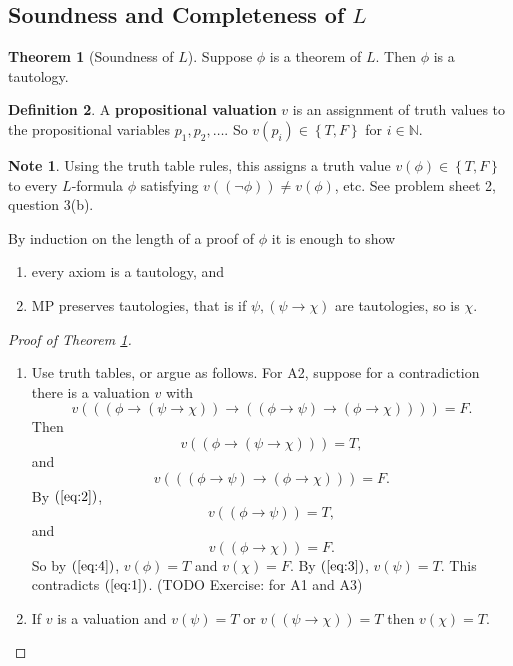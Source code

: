 \documentclass{article}
\newcommand{\N}{\mathbb{N}}
\newcommand{\rb}[1]{\left( #1 \right)}
\newcommand{\cb}[1]{\left\{ #1 \right\}}
\newcommand{\notb}[1]{\rb{\neg #1}}
\newcommand{\impb}[2]{\rb{#1 \rightarrow #2}}
\theoremstyle{definition}\newtheorem{definition}{Definition}[subsection]
\theoremstyle{definition}\newtheorem{remark}[definition]{Remark}
\theoremstyle{definition}\newtheorem*{example}{Example}
\theoremstyle{definition}\newtheorem*{note}{Note}
\newtheorem{theorem}[definition]{Theorem}
\begin{document}

\subsection{Soundness and Completeness of $ L $}

\begin{theorem}[Soundness of $ L $]
\label{thm:1.3.1}
Suppose $ \phi $ is a theorem of $ L $. Then $ \phi $ is a tautology.
\end{theorem}

\begin{definition}
A \textbf{propositional valuation} $ v $ is an assignment of truth values to the propositional variables $ p_1, p_2, \dots $. So $ v\rb{p_i} \in \cb{T, F} $ for $ i \in \N $.
\end{definition}

\begin{note}
Using the truth table rules, this assigns a truth value $ v\rb{\phi} \in \cb{T, F} $ to every $ L $-formula $ \phi $ satisfying $ v\rb{\notb{\phi}} \ne v\rb{\phi} $, etc. See problem sheet 2, question 3(b).
\end{note}

By induction on the length of a proof of $ \phi $ it is enough to show
\begin{enumerate}
\item every axiom is a tautology, and
\item MP preserves tautologies, that is if $ \psi, \impb{\psi}{\chi} $ are tautologies, so is $ \chi $.
\end{enumerate}

\begin{proof}[Proof of Theorem \ref{thm:1.3.1}]
\hfill
\begin{enumerate}
\item Use truth tables, or argue as follows. For A2, suppose for a contradiction there is a valuation $ v $ with
$$ v\rb{\impb{\impb{\phi}{\impb{\psi}{\chi}}}{\impb{\impb{\phi}{\psi}}{\impb{\phi}{\chi}}}} = F. $$
Then
\begin{equation}
\label{eq:1}
v\rb{\impb{\phi}{\impb{\psi}{\chi}}} = T,
\end{equation}
and
\begin{equation}
\label{eq:2}
v\rb{\impb{\impb{\phi}{\psi}}{\impb{\phi}{\chi}}} = F.
\end{equation}
By $ \rb{\ref{eq:2}} $,
\begin{equation}
\label{eq:3}
v\rb{\impb{\phi}{\psi}} = T,
\end{equation}
and
\begin{equation}
\label{eq:4}
v\rb{\impb{\phi}{\chi}} = F.
\end{equation}
So by $ \rb{\ref{eq:4}} $, $ v\rb{\phi} = T $ and $ v\rb{\chi} = F $. By $ \rb{\ref{eq:3}} $, $ v\rb{\psi} = T $. This contradicts $ \rb{\ref{eq:1}} $. (TODO Exercise: for A1 and A3)
\item If $ v $ is a valuation and $ v\rb{\psi} = T $ or $ v\rb{\impb{\psi}{\chi}} = T $ then $ v\rb{\chi} = T $.
\end{enumerate}
\end{proof}
\end{document}
